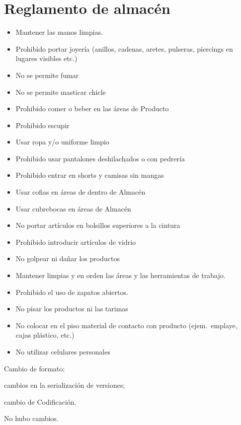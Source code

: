 \renewcommand{\MayorVer}{2}
\renewcommand{\MenorVer}{1}
\renewcommand{\Codigo}{BPD-5-CI/CE}
\renewcommand{\FechaPub}{2023--01}
\renewcommand{\Titulo}{Reglamento de almacén}
\section{\Titulo}

\begin{itemize}
	\item Mantener las manos limpias.
	\item Prohibido portar joyería (anillos, cadenas, aretes, pulseras, piercings en lugares visibles etc.)
	\item No se permite fumar
	\item No se permite masticar chicle
	\item Prohibido comer o beber en las áreas de Producto
	\item Prohibido escupir
	\item Usar ropa y/o uniforme limpio
	\item Prohibido usar pantalones deshilachados o con pedrería
	\item Prohibido entrar en shorts y camisas sin mangas
	\item Usar cofias en áreas de dentro de Almacén
	\item Usar cubrebocas en áreas de Almacén
	\item No portar artículos en bolsillos superiores a la cintura
	\item Prohibido introducir artículos de vidrio
	\item No golpear ni dañar los productos
	\item Mantener limpias y en orden las áreas y las herramientas de trabajo.
	\item Prohibido el uso de zapatos abiertos.
	\item No pisar los productos ni las tarimas
	\item No colocar en el piso material de contacto con producto (ejem.\ emplaye, cajas plástico, etc.)
	\item No utilizar celulares personales
\end{itemize}

\begin{changelog}[simple, sectioncmd=\subsection*,label=changelog-1.5]
	\begin{version}[v=2.1, date=2023--01, author=Pablo E. Alanis]
			\item Cambio de formato;
			\item cambios en la serialización de versiones;
			\item cambio de Codificación.
	\end{version}

	\begin{version}[v=1.6, date=2022-05, author=Alonso M.]
		\item No hubo cambios.
	\end{version}

\end{changelog}